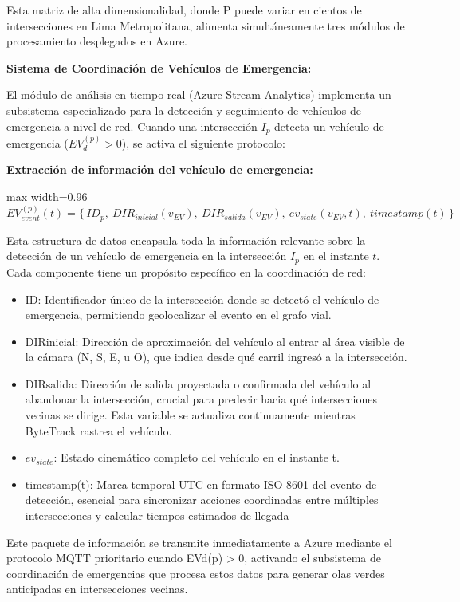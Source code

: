 \documentclass[12pt,a4paper,oneside]{report}
\newenvironment{centeredmath}
  {\begin{center}\begin{adjustbox}{max width=0.96\linewidth}\(\displaystyle}
  {\)\end{adjustbox}\end{center}}
\begin{document}
Esta matriz de alta dimensionalidad, donde P puede variar en cientos de intersecciones en Lima Metropolitana, alimenta simultáneamente tres módulos de procesamiento desplegados en Azure.

\textbf{Sistema de Coordinación de Vehículos de Emergencia:}

El módulo de análisis en tiempo real (Azure Stream Analytics) implementa un subsistema especializado para la detección y seguimiento de vehículos de emergencia a nivel de red. Cuando una intersección \(I_{p}\) detecta un vehículo de emergencia (\(EV_{d}^{(p)} > 0\)), se activa el siguiente protocolo:

\textbf{Extracción de información del vehículo de emergencia:}

\begin{centeredmath}
EV_{event}^{(p)}(t) = \{\, ID_{p},\ DIR_{inicial}(v_{EV}),\ DIR_{salida}(v_{EV}),\ ev_{state}(v_{EV},t),\ timestamp(t) \,\}
\end{centeredmath}

Esta estructura de datos encapsula toda la información relevante sobre la detección de un vehículo de emergencia en la intersección \(I_{p}\) en el instante \(t\). Cada componente tiene un propósito específico en la coordinación de red:

\begin{itemize}
\item
  ID: Identificador único de la intersección donde se detectó el vehículo de emergencia, permitiendo geolocalizar el evento en el grafo vial.
\item
  DIRinicial: Dirección de aproximación del vehículo al entrar al área visible de la cámara (N, S, E, u O), que indica desde qué carril ingresó a la intersección.
\item
  DIRsalida: Dirección de salida proyectada o confirmada del vehículo al abandonar la intersección, crucial para predecir hacia qué intersecciones vecinas se dirige. Esta variable se actualiza continuamente mientras ByteTrack rastrea el vehículo.
\item
  \(ev_{state}\): Estado cinemático completo del vehículo en el instante t.
\item
  timestamp(t): Marca temporal UTC en formato ISO 8601 del evento de detección, esencial para sincronizar acciones coordinadas entre múltiples intersecciones y calcular tiempos estimados de llegada
\end{itemize}

Este paquete de información se transmite inmediatamente a Azure mediante el protocolo MQTT prioritario cuando EVd(p) \textgreater{} 0, activando el subsistema de coordinación de emergencias que procesa estos datos para generar olas verdes anticipadas en intersecciones vecinas.
\end{document}

